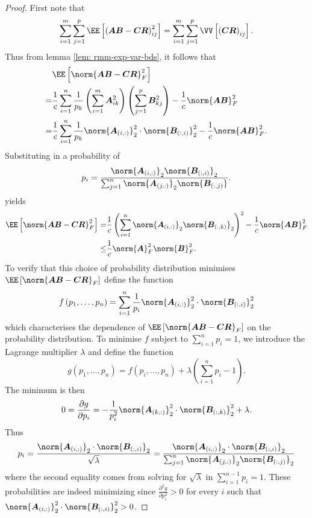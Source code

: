\begin{proof}
    First note that
    \[
        \sum_{i=1}^{m} \sum_{j=1}^{p} \EE \left[ \left( \bm{A} \bm{B} - \bm{C} \bm{R}\right)_{ij}^{2} \right] = \sum_{i=1}^{m} \sum_{j=1}^{p} \VV \left[ \left( \bm{C} \bm{R} \right)_{ij} \right].
    \]
    Thus from lemma \ref{lem: rmm-exp-var-bds}, it follows that
    \begin{align*}
          & \EE \left[ \norm{\bm{A} \bm{B} - \bm{C} \bm{R}}^2_F \right]                                                                                                                     \\
        = & \frac{1}{c} \sum_{i=1}^{n} \frac{1}{p_k} \left( \sum_{i=1}^{m} \bm{A}_{ik}^{2} \right) \left( \sum_{j=1}^{p} \bm{B}_{kj}^{2} \right) - \frac{1}{c} \norm{\bm{A} \bm{B}}_{F}^{2} \\
        = & \frac{1}{c} \sum_{i=1}^{n} \frac{1}{p_k} \norm{\bm{A}_{(i,:)}}_{2}^{2} \cdot \norm{\bm{B}_{(:,i)}}_{2}^{2} - \frac{1}{c} \norm{\bm{A} \bm{B}}_{F}^{2}.
    \end{align*}
    Substituting in a probability of
    \[
        p_i = \frac{\norm{\bm{A}_{(i,:)}}_2 \norm{\bm{B}_{(:,i)}}_2}{\sum_{j=1}^{n} \norm{\bm{A}_{(j,:)}}_2 \norm{\bm{B}_{(:,j)}}}.
    \]
    yields
    \begin{align*}
        \EE \left[ \norm{\bm{A} \bm{B} - \bm{C} \bm{R}}^2_F \right] = & \frac{1}{c} \left( \sum_{i=1}^{n} \norm{\bm{A}_{(i,:)}}_{2} \norm{\bm{B}_{(:,k)}}_{2} \right)^{2} - \frac{1}{c} \norm{\bm{A} \bm{B}}_{F}^{2} \\
        \leq                                                          & \frac{1}{c} \norm{\bm{A}}^2_{F} \norm{\bm{B}}^2_{F}.
    \end{align*}
    To verify that this choice of probability distribution minimises $\EE \left[ \norm{\bm{A} \bm{B} - \bm{C} \bm{R}}_{F} \right]$ define the function
    \[
        f \left( p_1 , \ldots , p_n \right) = \sum_{i=1}^{n} \frac{1}{p_i} \norm{\bm{A}_{(i,:)}}_{2}^{2} \cdot \norm{\bm{B}_{(:,i)}}_{2}^{2}
    \]
    which characterises the dependence of $\EE \left[ \norm{\bm{A} \bm{B} - \bm{C} \bm{R}}_{F} \right]$ on the probability distribution. To minimise $f$ subject to $\sum_{i=1}^{n} p_i = 1$, we introduce the Lagrange multiplier $\lambda$ and define the function
    \[
        g \left( p_1 , \ldots , p_n \right) = f \left( p_i , \ldots , p_n \right) + \lambda \left( \sum_{i=1}^{n} p_i - 1 \right).
    \]
    The minimum is then
    \[
        0 = \frac{\partial g}{\partial p_i} = - \frac{1}{p_i^2} \norm{\bm{A}_{(k,:)}}_{2}^{2} \cdot \norm{\bm{B}_{(:,k)}}_{2}^{2} + \lambda.
    \]
    Thus
    \[
        p_i = \frac{\norm{\bm{A}_{(i,:)}}_{2} \cdot \norm{\bm{B}_{(:,i)}}_{2}}{\sqrt{\lambda}} = \frac{\norm{\bm{A}_{(i,:)}}_{2} \cdot \norm{\bm{B}_{(:,i)}}_{2}}{\sum_{j=1}^{n} \norm{\bm{A}_{(j,:)}}_{2} \norm{\bm{B}_{(:,j)}}_{2}}
    \]
    where the second equality comes from solving for $\sqrt{\lambda}$ in $\sum_{i=1}^{n-1} p_i = 1$. These probabilities are indeed minimizing since $\frac{\partial^2 g}{\partial p_i^2} > 0$ for every $i$ such that $\norm{\bm{A}_{(i,:)}}_{2}^{2} \cdot \norm{\bm{B}_{(:,i)}}_{2}^{2} > 0$.
\end{proof}